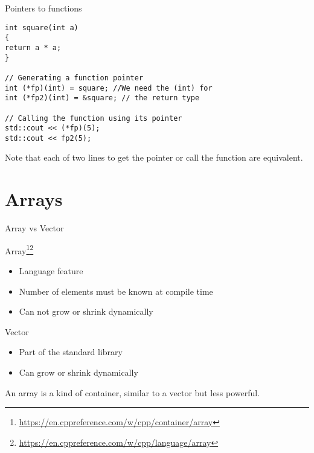 \documentclass[\classoption]{beamer}
\begin{document}
\begin{frame}[fragile]{Pointers to functions}

\begin{lstlisting}
int square(int a)
{
return a * a;
}

// Generating a function pointer
int (*fp)(int) = square; //We need the (int) for
int (*fp2)(int) = &square; // the return type

// Calling the function using its pointer
std::cout << (*fp)(5);
std::cout << fp2(5);

\end{lstlisting}
Note that each of two lines to get the pointer or call the function are equivalent. 

\end{frame}

\section{Arrays}

\begin{frame}{Array vs Vector}


\begin{block}{Array\footnote{\tiny\url{https://en.cppreference.com/w/cpp/container/array}}\footnote{\tiny\url{https://en.cppreference.com/w/cpp/language/array}}}
\begin{itemize}
\item Language feature
\item Number of elements must be known at compile time
\item Can not grow or shrink dynamically
\end{itemize}
\end{block}

\begin{block}{Vector}
\begin{itemize}
\item Part of the standard library
\item Can grow or shrink dynamically
\end{itemize}
\end{block}
An array is a kind of container, similar to a vector but less powerful.
\end{frame}
\end{document}
